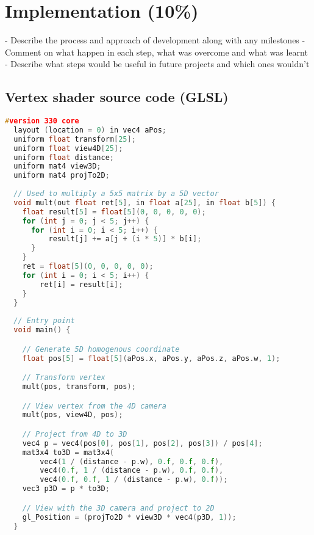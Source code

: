 \documentclass[11pt, a4paper]{article}
\begin{document}
\section{Implementation (10\%)}

- Describe the process and approach of development along with any milestones
- Comment on what happen in each step, what was overcome and what was learnt
- Describe what steps would be useful in future projects and which ones wouldn't

\cleardoublepage
\printbibliography[
  heading=bibintoc,
  title={Bibliography}
]

\cleardoublepage
\begin{appendices}

\section{Vertex shader source code (GLSL)}
\label{app:vertexShader}

\begin{lstlisting}[language=c++]
  #version 330 core
  layout (location = 0) in vec4 aPos;
  uniform float transform[25];
  uniform float view4D[25];
  uniform float distance;
  uniform mat4 view3D;
  uniform mat4 projTo2D;
  
  // Used to multiply a 5x5 matrix by a 5D vector
  void mult(out float ret[5], in float a[25], in float b[5]) {
    float result[5] = float[5](0, 0, 0, 0, 0);
    for (int j = 0; j < 5; j++) {
      for (int i = 0; i < 5; i++) {
          result[j] += a[j + (i * 5)] * b[i];
      }
    }
    ret = float[5](0, 0, 0, 0, 0);
    for (int i = 0; i < 5; i++) {
        ret[i] = result[i];
    }
  }
  
  // Entry point
  void main() {

    // Generate 5D homogenous coordinate
    float pos[5] = float[5](aPos.x, aPos.y, aPos.z, aPos.w, 1);

    // Transform vertex
    mult(pos, transform, pos);

    // View vertex from the 4D camera
    mult(pos, view4D, pos);

    // Project from 4D to 3D
    vec4 p = vec4(pos[0], pos[1], pos[2], pos[3]) / pos[4];
    mat3x4 to3D = mat3x4(
        vec4(1 / (distance - p.w), 0.f, 0.f, 0.f),
        vec4(0.f, 1 / (distance - p.w), 0.f, 0.f),
        vec4(0.f, 0.f, 1 / (distance - p.w), 0.f));
    vec3 p3D = p * to3D;

    // View with the 3D camera and project to 2D
    gl_Position = (projTo2D * view3D * vec4(p3D, 1));
  }
\end{lstlisting}

\end{appendices}
\end{document}
